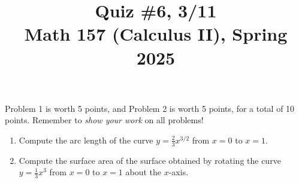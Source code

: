 \documentclass[11pt]{article}
\title{Quiz \#6, 3/11 \\ Math 157 (Calculus II), Spring 2025}
\date{}
\begin{document}
\maketitle

\thispagestyle{empty}

\vspace{-2cm}

Problem 1 is worth 5 points, and Problem 2 is worth 5 points, for a total of 10 points. Remember to \emph{show your work} on all problems!

\begin{enumerate}
\item Compute the arc length of the curve $y= \frac{2}{3} x^{3/2}$ from $x = 0$ to $x=1$.

\vspace{8.25cm}

\item Compute the surface area of the surface obtained by rotating the curve $y=\frac{1}{3}x^3$ from $x = 0$ to $x=1$ about the $x$-axis.

\end{enumerate}
\end{document}
